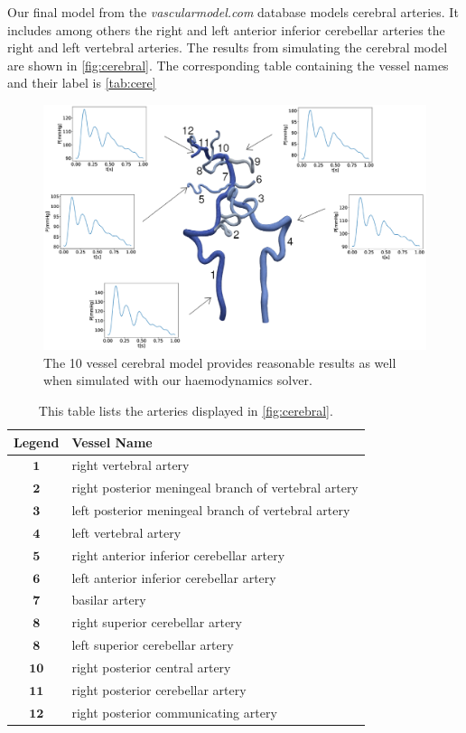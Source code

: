 \documentclass[a4paper, oneside]{discothesis}
\begin{document}
Our final model from the \emph{vascularmodel.com} database models cerebral arteries.
It includes among others the right and left anterior inferior cerebellar arteries the right and left vertebral arteries.
The results from simulating the cerebral model are shown in \autoref{fig:cerebral}.
The corresponding table containing the vessel names and their label is \autoref{tab:cere}
\begin{figure} [H]
	\centering
	\includegraphics[width=0.8\columnwidth]{figures/0053.eps}
	\caption{The 10 vessel cerebral model provides reasonable results as well when simulated with our haemodynamics solver.}
	\label{fig:cerebral}
\end{figure}
\begin{table}[H]
	\begin{center}
		\begin{tabular}{|c|l|}
			\hline
			Legend & Vessel Name\\
			\hline
			$\mathbf{1}$& right vertebral artery \\ 
			$\mathbf{2}$& right posterior meningeal branch of vertebral artery \\
			$\mathbf{3}$& left posterior meningeal branch of vertebral artery\\
			$\mathbf{4}$& left vertebral artery \\ 
			$\mathbf{5}$& right anterior inferior cerebellar artery \\
			$\mathbf{6}$& left anterior inferior cerebellar artery \\
			$\mathbf{7}$& basilar artery \\
			$\mathbf{8}$& right superior cerebellar artery \\
			$\mathbf{8}$& left superior cerebellar artery \\
			$\mathbf{10}$& right posterior central artery \\
			$\mathbf{11}$& right posterior cerebellar artery \\
			$\mathbf{12}$& right posterior communicating artery \\
			\hline
		\end{tabular}
	\end{center}
	\caption{This table lists the arteries displayed in \autoref{fig:cerebral}.}

	\label{tab:cere}
\end{table}
\end{document}
